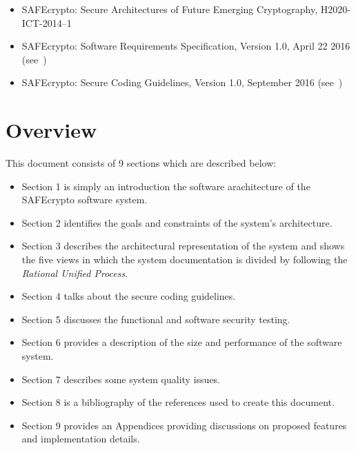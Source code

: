 \begin{itemize}
\item SAFEcrypto: Secure Architectures of Future Emerging Cryptography, H2020-ICT-2014--1 \cite{safecrypto}
\item SAFEcrypto: Software Requirements Specification, Version 1.0, April 22 2016 (see~\cite{safecrypto_srs})
\item SAFEcrypto: Secure Coding Guidelines, Version 1.0, September 2016 (see~\cite{safecrypto_secure_coding_guidelines})
\end{itemize}

\section{Overview}
This document consists of 9 sections which are described below:

\begin{itemize}
\item Section 1 is simply an introduction the software arachitecture of the SAFEcrypto software system.
\item Section 2 identifies the goals and constraints of the system's architecture.
\item Section 3 describes the architectural representation of the system and shows the five views in which the system documentation is divided by following the \textit{Rational Unified Process}.
\item Section 4 talks about the secure coding guidelines.
\item Section 5 discusses the functional and software security testing.
\item Section 6 provides a description of the size and performance of the software system.
\item Section 7 describes some system quality issues.
\item Section 8 is a bibliography of the references used to create this document.
\item Section 9 provides an Appendices providing discussions on proposed features and implementation details.
\end{itemize}

